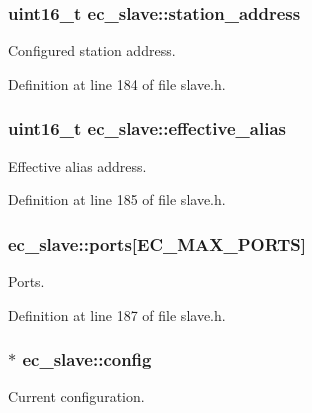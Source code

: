 \subsubsection[{station\-\_\-address}]{\setlength{\rightskip}{0pt plus 5cm}uint16\-\_\-t ec\-\_\-slave\-::station\-\_\-address}\label{structec__slave_ae4c26b32979bcb21cf391ca3b170d701}


Configured station address. 



Definition at line 184 of file slave.\-h.

\subsubsection[{effective\-\_\-alias}]{\setlength{\rightskip}{0pt plus 5cm}uint16\-\_\-t ec\-\_\-slave\-::effective\-\_\-alias}\label{structec__slave_a954d95e8464b5dcb7084463d00760291}


Effective alias address. 



Definition at line 185 of file slave.\-h.

\subsubsection[{ports}]{ ec\-\_\-slave\-::ports[{\bf E\-C\-\_\-\-M\-A\-X\-\_\-\-P\-O\-R\-T\-S}]}\label{structec__slave_a0dc49f089a749f49fcce90007063ed85}


Ports. 



Definition at line 187 of file slave.\-h.

\subsubsection[{config}]{$\ast$ ec\-\_\-slave\-::config}\label{structec__slave_a35616766fc7afbd4fc0b8a5d5a652bf7}


Current configuration. 



